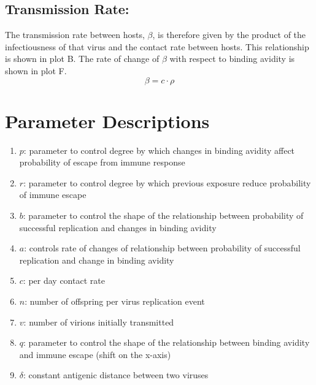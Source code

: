 \documentclass[a4paper,11pt,twoside]{article}
\begin{document}
\subsection*{Transmission Rate:}
The transmission rate between hosts, $\beta$, is therefore given by the product of the infectiousness of that virus and the contact rate between hosts. This relationship is shown in plot B. The rate of change of $\beta$ with respect to binding avidity is shown in plot F.
\begin{equation}
\beta = c \cdot \rho
\end{equation}




\section*{Parameter Descriptions}
\begin{enumerate}
\item $p$: parameter to control degree by which changes in binding avidity affect probability of escape from immune response
\item $r$: parameter to control degree by which previous exposure reduce probability of immune escape
\item $b$: parameter to control the shape of the relationship between probability of successful replication and changes in binding avidity
\item $a$: controls rate of changes of relationship between probability of successful replication and change in binding avidity
\item $c$: per day contact rate
\item $n$: number of offspring per virus replication event
\item $v$: number of virions initially transmitted
\item $q$: parameter to control the shape of the relationship between binding avidity and immune escape (shift on the x-axis)
\item $\delta$: constant antigenic distance between two viruses
\end{enumerate}
\end{document}
